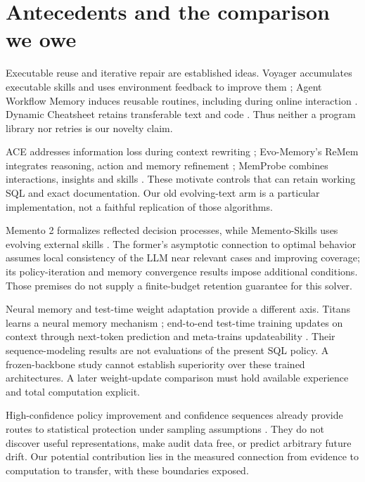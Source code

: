\documentclass[10pt,twocolumn]{article}
\begin{document}
\section{Antecedents and the comparison we owe}
Executable reuse and iterative repair are established ideas. Voyager accumulates
executable skills and uses environment feedback to improve them
\citep{wang2023voyager}; Agent Workflow Memory induces reusable routines,
including during online interaction \citep{wang2024awm}. Dynamic Cheatsheet
retains transferable text and code \citep{suzgun2025dynamic}. Thus neither a
program library nor retries is our novelty claim.

ACE addresses information loss during context rewriting
\citep{zhang2025ace}; Evo-Memory's ReMem integrates reasoning, action and memory
refinement \citep{wei2025evomemory}; MemProbe combines interactions, insights and
skills \citep{shu2026agentcl}. These motivate controls that can retain working
SQL and exact documentation. Our old evolving-text arm is a particular
implementation, not a faithful replication of those algorithms.

Memento 2 formalizes reflected decision processes, while Memento-Skills uses
evolving external skills \citep{wang2025memento,zhou2026memento}. The former's
asymptotic connection to optimal behavior assumes local consistency of the LLM
near relevant cases and improving coverage; its policy-iteration and memory
convergence results impose additional conditions. Those premises do not supply
a finite-budget retention guarantee for this solver.

Neural memory and test-time weight adaptation provide a different axis.
Titans learns a neural memory mechanism \citep{behrouz2025titans}; end-to-end
test-time training updates on context through next-token prediction and
meta-trains updateability \citep{tandon2025ttt}. Their sequence-modeling results
are not evaluations of the present SQL policy. A frozen-backbone study cannot
establish superiority over these trained architectures. A later weight-update
comparison must hold available experience and total computation explicit.

High-confidence policy improvement and confidence sequences already provide
routes to statistical protection under sampling assumptions
\citep{thomas2015hcpi,howard2021confidence}. They do not discover useful
representations, make audit data free, or predict arbitrary future drift. Our
potential contribution lies in the measured connection from evidence to
computation to transfer, with these boundaries exposed.
\end{document}
